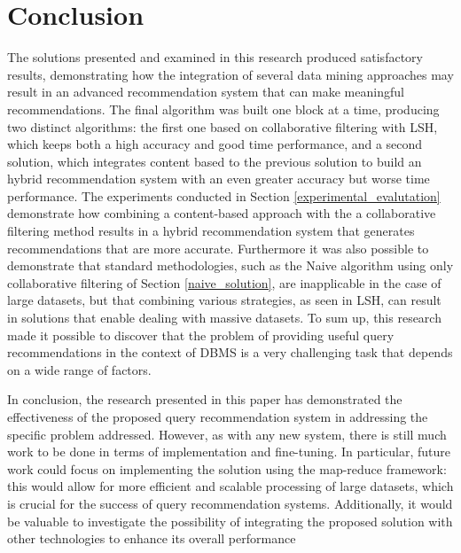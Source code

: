 \section{Conclusion}

The solutions presented and examined in this research produced satisfactory results, demonstrating how the integration of several data mining approaches may result in an advanced recommendation system that can make meaningful recommendations. The final algorithm was built one block at a time, producing two distinct algorithms: the first one based on collaborative filtering with LSH, which keeps both a high accuracy and good time performance, and a second solution, which integrates content based to the previous solution to build an hybrid recommendation system with an even greater accuracy but worse time performance. The experiments conducted in Section \ref{experimental_evalutation} demonstrate how combining a content-based approach with the a collaborative filtering method results in a hybrid recommendation system that generates recommendations that are more accurate. Furthermore it was also possible to demonstrate that standard methodologies, such as the Naive algorithm using only collaborative filtering of Section \ref{naive_solution}, are inapplicable in the case of large datasets, but that combining various strategies, as seen in LSH, can result in solutions that enable dealing with massive datasets. To sum up, this research made it possible to discover that the problem of providing useful query recommendations in the context of DBMS is a very challenging task that depends on a wide range of factors. 


In conclusion, the research presented in this paper has demonstrated the effectiveness of the proposed query recommendation system in addressing the specific problem addressed. However, as with any new system, there is still much work to be done in terms of implementation and fine-tuning. In particular, future work could focus on implementing the solution using the map-reduce framework: this would allow for more efficient and scalable processing of large datasets, which is crucial for the success of query recommendation systems. Additionally, it would be valuable to investigate the possibility of integrating the proposed solution with other technologies to enhance its overall performance